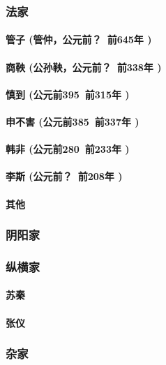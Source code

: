 \documentclass[UTF8]{../RepresentationUniverse}
\begin{document}
    \subsubsection{法家}
        \paragraph{管子 (管仲，公元前？~前645年 )}
        \paragraph{商鞅 (公孙鞅，公元前？~前338年 )}
        \paragraph{慎到 (公元前395~前315年 )}
        \paragraph{申不害 (公元前385~前337年 )}
        \paragraph{韩非 (公元前280~前233年 )}
        \paragraph{李斯 (公元前？~前208年 )}
        \paragraph{其他}

    \subsubsection{阴阳家}
    \subsubsection{纵横家}
        \paragraph{苏秦}
        \paragraph{张仪}

    \subsubsection{杂家}
\end{document}
